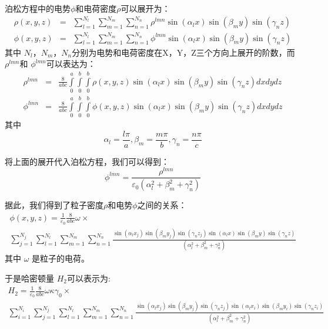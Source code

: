 {泊松方程中的电势$\phi$和电荷密度$\rho$可以展开为：
\begin{eqnarray}
 \rho(x,y,z)&=&\sum\limits_{l=1}^{{{N}_{l}}}{\sum\limits_{m=1}^{{{N}_{m}}}{\sum\limits_{n=1}^{{{N}_{n}}}{{{\rho }^{lmn}}\sin ({{\alpha }_{l}}x)\sin ({{\beta }_{m}}y)\sin ({{\gamma }_{n}}z)}}} \\
 \phi(x,y,z)&=&\sum\limits_{l=1}^{{{N}_{l}}}{\sum\limits_{m=1}^{{{N}_{m}}}{\sum\limits_{n=1}^{{{N}_{n}}}{{{\phi }^{lmn}}\sin ({{\alpha }_{l}}x)\sin ({{\beta }_{m}}y)\sin ({{\gamma }_{n}}z)}}}
\end{eqnarray}
其中 ${N}_{l}$，${N}_{m}$，${N}_{n}$分别为电势和电荷密度在X，Y，Z三个方向上展开的阶数，而 ${\rho }^{lmn}$和 ${\phi }^{lmn}$可以表达为：
\begin{eqnarray}
  {{\rho }^{lmn}}&=&\frac{8}{abc}\int\limits_{0}^{a}{\int\limits_{0}^{b}{\int\limits_{0}^{b}{\rho (x,y,z)\sin ({{\alpha }_{l}}x)\sin ({{\beta }_{m}}y)\sin ({{\gamma }_{n}}z)dxdydz}}} \\
 {{\phi }^{lmn}}&=&\frac{8}{abc}\int\limits_{0}^{a}{\int\limits_{0}^{b}{\int\limits_{0}^{b}{\phi (x,y,z)\sin ({{\alpha }_{l}}x)\sin ({{\beta }_{m}}y)\sin ({{\gamma }_{n}}z)dxdydz}}}
\end{eqnarray}
其中
\begin{equation}
{{\alpha }_{l}}=\frac{l\pi }{a},{{\beta }_{m}}=\frac{m\pi }{b},{{\gamma }_{n}}=\frac{n\pi }{c}
\end{equation}

将上面的展开代入泊松方程，我们可以得到：
\begin{equation}
{{\phi }^{lmn}}=\frac{{{\rho }^{lmn}}}{{{\varepsilon }_{0}}(\alpha _{l}^{2}+\beta _{m}^{2}+\gamma _{n}^{2})}
\end{equation}

据此，我们得到了粒子密度$ \rho $和电势$ \phi $之间的关系：
\begin{multline}
\phi (x,y,z)=\frac{1}{{{\varepsilon }_{0}}}\frac{8}{abc}\omega \times \\ \sum\limits_{j=1}^{{{N}_{j}}}{\sum\limits_{l=1}^{{{N}_{l}}}{\sum\limits_{m=1}^{{{N}_{m}}}{\sum\limits_{n=1}^{{{N}_{n}}}{\frac{\sin ({{\alpha }_{l}}{{x}_{j}})\sin ({{\beta }_{m}}{{y}_{j}})\sin ({{\gamma }_{n}}{{z}_{j}})\sin ({{\alpha }_{l}}x)\sin ({{\beta }_{m}}y)\sin ({{\gamma }_{n}}z)}{(\alpha _{l}^{2}+\beta _{m}^{2}+\gamma _{n}^{2})}}}}}
\end{multline}
其中 $\omega $ 是粒子的电荷。

于是哈密顿量 ${{H}_{2}}$可以表示为:
\begin{multline}
{{H}_{2}}=\frac{1}{{{\varepsilon }_{0}}}\frac{8}{abc}\omega \kappa {{\gamma}_{0}} \times \\
\sum\limits_{i=1}^{{{N}_{i}}}{\sum\limits_{j=1}^{{{N}_{j}}}{\sum\limits_{l=1}^{{{N}_{l}}}{\sum\limits_{m=1}^{{{N}_{m}}}{\sum\limits_{n=1}^{{{N}_{n}}}
{\frac{\sin ({{\alpha }_{l}}{{x}_{j}})\sin ({{\beta }_{m}}{{y}_{j}})\sin ({{\gamma }_{n}}{{z}_{j}})\sin ({{\alpha }_{l}}{{x}_{i}})\sin ({{\beta }_{m}}{{y}_{i}})\sin ({{\gamma }_{n}}{{z}_{i}})}{(\alpha _{l}^{2}+\beta _{m}^{2}+\gamma _{n}^{2})}}
}}}}
\end{multline}

}
